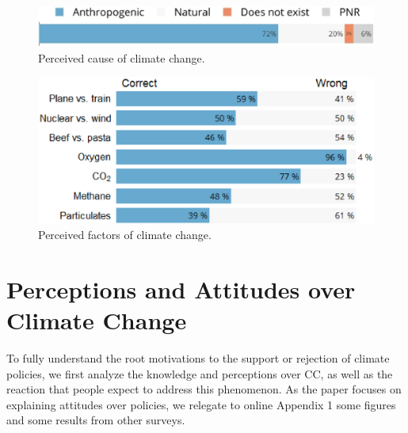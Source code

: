 \documentclass[english,5p,authoryear]{elsarticle}
\begin{document}
\begin{figure}[b]
\centering
\includegraphics[width=\columnwidth]{Images_EPS/CC_cause_nolegend2.eps}
\caption{Perceived cause of climate change.}
\label{fig:cause}
\end{figure}

\begin{figure}[t]
\centering
\includegraphics[width=\columnwidth]{Images_EPS/CC_knowledge_valbtr.eps}
\caption{Perceived factors of climate change.}
\label{fig:factors}
\end{figure}

\section{Perceptions and Attitudes over Climate Change\label{sec:attitudes_climate_change}}
    
To fully understand the root motivations to the support or rejection of climate policies, we first analyze the knowledge and perceptions over CC, as well as the reaction that people expect to address this phenomenon. As the paper focuses on explaining attitudes over policies, we relegate to online Appendix 1 some figures and some results from other surveys.
    
\end{document}

